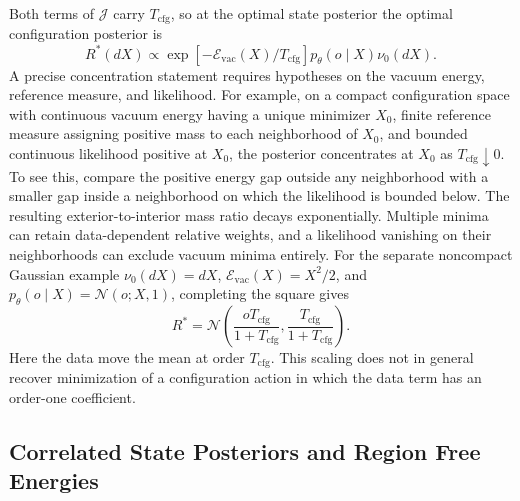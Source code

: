 Both terms of $\mathcal{J}$ carry $T_{\mathrm{cfg}}$, so at the optimal state posterior the optimal configuration posterior is
\[
R^*(dX)\propto
\exp[-\mathcal E_{\mathrm{vac}}(X)/T_{\mathrm{cfg}}]
p_\theta(o\mid X)\nu_0(dX).
\]
A precise concentration statement requires hypotheses on the vacuum energy, reference measure, and likelihood. For example, on a compact configuration space with continuous vacuum energy having a unique minimizer $X_0$, finite reference measure assigning positive mass to each neighborhood of $X_0$, and bounded continuous likelihood positive at $X_0$, the posterior concentrates at $X_0$ as $T_{\mathrm{cfg}}\downarrow0$. To see this, compare the positive energy gap outside any neighborhood with a smaller gap inside a neighborhood on which the likelihood is bounded below. The resulting exterior-to-interior mass ratio decays exponentially. Multiple minima can retain data-dependent relative weights, and a likelihood vanishing on their neighborhoods can exclude vacuum minima entirely. For the separate noncompact Gaussian example $\nu_0(dX)=dX$, $\mathcal E_{\mathrm{vac}}(X)=X^2/2$, and $p_\theta(o\mid X)=\mathcal N(o;X,1)$, completing the square gives
\[
R^*=\mathcal N\left(
\frac{oT_{\mathrm{cfg}}}{1+T_{\mathrm{cfg}}},
\frac{T_{\mathrm{cfg}}}{1+T_{\mathrm{cfg}}}\right).
\]
Here the data move the mean at order $T_{\mathrm{cfg}}$. This scaling does not in general recover minimization of a configuration action in which the data term has an order-one coefficient.

\subsection{Correlated State Posteriors and Region Free Energies}

